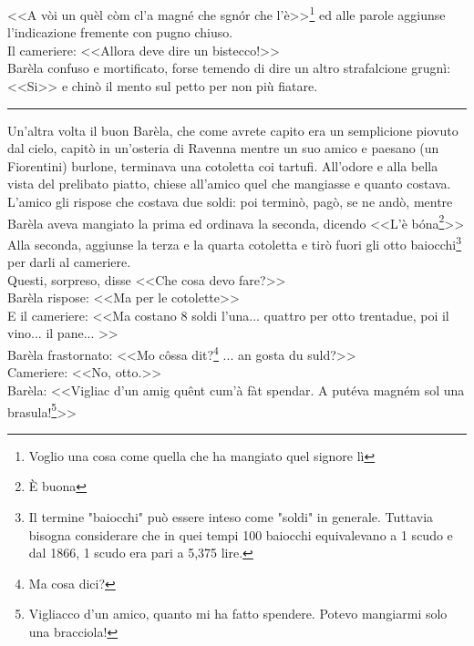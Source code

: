 \indent <<A vòi un quèl còm cl'a magné che sgnór che l'è>>\footnote{Voglio una cosa come quella che ha mangiato quel signore lì} ed alle parole aggiunse l'indicazione fremente con pugno chiuso.\\
\indent Il cameriere: <<Allora deve dire un bistecco!>>\\
Barèla confuso e mortificato, forse temendo di dire un altro strafalcione grugnì: <<Si>> e chinò il mento sul petto per non più fiatare.
\begin{center}
\rule{1.5cm}{0.4pt}
\end{center}
Un'altra volta il buon Barèla, che come avrete capito era un semplicione piovuto dal cielo, capitò in un'osteria di Ravenna mentre un suo amico e paesano (un Fiorentini) burlone, terminava una cotoletta coi tartufi. All'odore e alla bella vista del prelibato piatto, chiese all'amico quel che mangiasse e quanto costava. L'amico gli rispose che costava due soldi: poi terminò, pagò, se ne andò, mentre Barèla aveva mangiato la prima ed ordinava la seconda, dicendo <<L'è bóna\footnote{È buona}>>\\
Alla seconda, aggiunse la terza e la quarta cotoletta e tirò fuori gli otto baiocchi\footnote{Il termine "baiocchi" può essere inteso come "soldi" in generale. Tuttavia bisogna considerare che in quei tempi 100 baiocchi equivalevano a 1 scudo e dal 1866, 1 scudo era pari a 5,375 lire.} per darli al cameriere.\\
\indent Questi, sorpreso, disse <<Che cosa devo fare?>>\\
\indent {}Barèla rispose: <<Ma per le cotolette>>\\
\indent E il cameriere: <<Ma costano 8 soldi l'una... quattro per otto trentadue, poi il vino... il pane... >>\\
\indent {}Barèla frastornato: <<Mo côssa dit?\footnote{Ma cosa dici?} ... an gosta du suld?>>\\
\indent Cameriere: <<No, otto.>>\\
\indent {}Barèla: <<Vigliac d'un amig quênt cum'à fàt spendar. A putéva magném sol una brasula!\footnote{Vigliacco d'un amico, quanto mi ha fatto spendere. Potevo mangiarmi solo una bracciola!}>>






































%